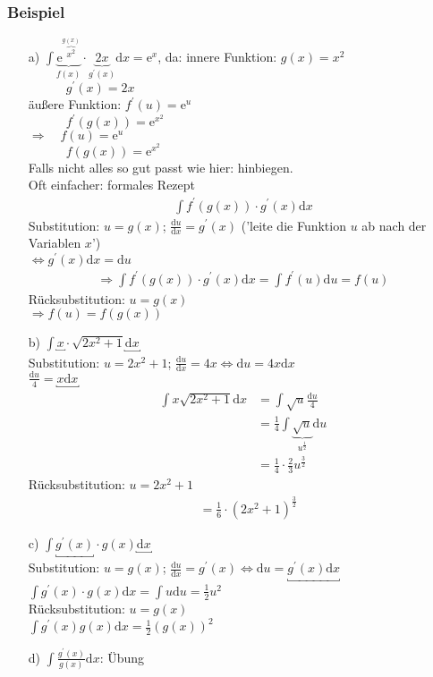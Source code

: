 \documentclass[12pt, titlepage]{article}
\newcommand{\e}{\textrm{e}}
\renewcommand{\>}{\rightarrow}
\renewcommand{\*}{\cdot}
\begin{document}
	\subsubsection*{Beispiel}
	\begin{itemize}
		\item[a)] $\int\underbrace{\e^{\overbrace{x^2}^{g(x)}}}_{f(x)}\*\underbrace{2x}_{g^\prime(x)}\textrm{d}x=\e^x$, da:
		innere Funktion: $g(x)=x^2$\\
		$\qquad\quad g^\prime(x)=2x$\\
		äußere Funktion: $f^\prime(u)=\e^u$\\
		$\qquad\quad f^\prime(g(x))=\e^{x^2}$\\
		$\Rightarrow\quad f(u)=\e^u$\\
		$\qquad\quad f(g(x))=\e^{x^2}$\\
	Falls nicht alles so gut passt wie hier: hinbiegen.\\
	 Oft einfacher: formales Rezept
		\begin{align*}
			\int f^\prime(g(x))\*g^\prime(x)\textrm{d}x
		\end{align*}
		Substitution: $u=g(x)$; $\frac{\textrm{d}u}{\textrm{d}x}=g^\prime(x)$ ('leite die Funktion $u$ ab nach der Variablen $x$')\\
		$\Leftrightarrow g^\prime(x)\textrm{d}x=\textrm{d}u$
		\begin{align*}
			\Rightarrow \int f^\prime(g(x))\*g^\prime(x)\textrm{d}x=\int f^\prime(u)\textrm{d}u=f(u)
		\end{align*}
		Rücksubstitution: $u=g(x)$\\
		$\Rightarrow f(u)=f(g(x))$
		\item[b)] $\int\underbracket{x}_{}\*\sqrt{2x^2+1}\underbracket{\textrm{d}x}_{}$\\
		Substitution: $u=2x^2+1$; $\frac{\textrm{d}u}{\textrm{d}x}=4x\Leftrightarrow \textrm{d}u=4x\textrm{d}x$\\
		$\frac{\textrm{d}u}{4}=\underbracket{x\textrm{d}x}_{}$
		\begin{align*}
			\int x\sqrt{2x^2+1}\textrm{d}x&=\int\sqrt{u}\frac{\textrm{d}u}{4}\\
			&=\frac{1}{4}\int\underbrace{\sqrt{u}}_{u^{\frac{1}{2}}}\textrm{d}u\\
			&=\frac{1}{4}\*\frac{2}{3}u^{\frac{3}{2}}
		\end{align*}
		Rücksubstitution: $u=2x^2+1$
		\begin{align*}
			&=\frac{1}{6}\*(2x^2+1)^{\frac{3}{2}}
		\end{align*}
		\item[c)] $\int\underbracket{g^\prime(x)}_{}\*g(x)\underbracket{\textrm{d}x}_{}$\\
		Substitution: $u=g(x)$; $\frac{\textrm{d}u}{\textrm{d}x}=g^\prime(x)\Leftrightarrow \textrm{d}u=\underbracket{g^\prime(x)\textrm{d}x}_{}$\\
		$\int g^\prime(x)\*g(x)\textrm{d}x=\int u\textrm{d}u=\frac{1}{2}u^2$\\
		Rücksubstitution: $u=g(x)$\\
		$\int g^\prime(x)g(x)\textrm{d}x=\frac{1}{2}(g(x))^2$
		\item[d)] $\int\frac{g^\prime(x)}{g(x)}\textrm{d}x$: Übung
	\end{itemize}
\end{document}
